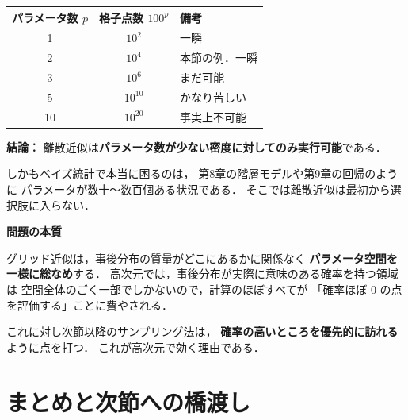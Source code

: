 \documentclass[lualatex,ja=standard,a4paper,12pt]{bxjsarticle}
\begin{document}
\begin{center}
\renewcommand{\arraystretch}{1.5}
\begin{tabular}{ccl}
\toprule
パラメータ数 $p$ & 格子点数 $100^p$ & 備考 \\
\midrule
1 & $10^{2}$ & 一瞬 \\
2 & $10^{4}$ & 本節の例．一瞬 \\
3 & $10^{6}$ & まだ可能 \\
5 & $10^{10}$ & かなり苦しい \\
10 & $10^{20}$ & 事実上不可能 \\
\bottomrule
\end{tabular}
\end{center}

\begin{warningbox}
\textbf{結論：}
離散近似は\textbf{パラメータ数が少ない密度に対してのみ実行可能}である．

\medskip
しかもベイズ統計で本当に困るのは，
第8章の階層モデルや第9章の回帰のように
パラメータが数十〜数百個ある状況である．
そこでは離散近似は最初から選択肢に入らない．
\end{warningbox}

\begin{pointbox}
\textbf{問題の本質}

グリッド近似は，事後分布の質量がどこにあるかに関係なく
\textbf{パラメータ空間を一様に総なめ}する．
高次元では，事後分布が実際に意味のある確率を持つ領域は
空間全体のごく一部でしかないので，計算のほぼすべてが
「確率ほぼ 0 の点を評価する」ことに費やされる．

\medskip
これに対し次節以降のサンプリング法は，
\textbf{確率の高いところを優先的に訪れる}ように点を打つ．
これが高次元で効く理由である．
\end{pointbox}

\section{まとめと次節への橋渡し}
\end{document}
